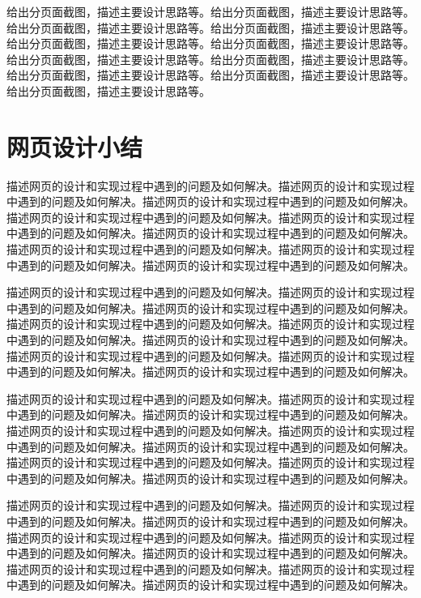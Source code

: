 \documentclass[supercite]{Experimental_Report}
\theoremstyle{definition}
\begin{document}
给出分页面截图，描述主要设计思路等。给出分页面截图，描述主要设计思路等。给出分页面截图，描述主要设计思路等。给出分页面截图，描述主要设计思路等。给出分页面截图，描述主要设计思路等。给出分页面截图，描述主要设计思路等。给出分页面截图，描述主要设计思路等。给出分页面截图，描述主要设计思路等。给出分页面截图，描述主要设计思路等。给出分页面截图，描述主要设计思路等。给出分页面截图，描述主要设计思路等。

\newpage

\section{网页设计小结}

描述网页的设计和实现过程中遇到的问题及如何解决。描述网页的设计和实现过程中遇到的问题及如何解决。描述网页的设计和实现过程中遇到的问题及如何解决。描述网页的设计和实现过程中遇到的问题及如何解决。描述网页的设计和实现过程中遇到的问题及如何解决。描述网页的设计和实现过程中遇到的问题及如何解决。描述网页的设计和实现过程中遇到的问题及如何解决。描述网页的设计和实现过程中遇到的问题及如何解决。描述网页的设计和实现过程中遇到的问题及如何解决。

描述网页的设计和实现过程中遇到的问题及如何解决。描述网页的设计和实现过程中遇到的问题及如何解决。描述网页的设计和实现过程中遇到的问题及如何解决。描述网页的设计和实现过程中遇到的问题及如何解决。描述网页的设计和实现过程中遇到的问题及如何解决。描述网页的设计和实现过程中遇到的问题及如何解决。描述网页的设计和实现过程中遇到的问题及如何解决。描述网页的设计和实现过程中遇到的问题及如何解决。描述网页的设计和实现过程中遇到的问题及如何解决。

描述网页的设计和实现过程中遇到的问题及如何解决。描述网页的设计和实现过程中遇到的问题及如何解决。描述网页的设计和实现过程中遇到的问题及如何解决。描述网页的设计和实现过程中遇到的问题及如何解决。描述网页的设计和实现过程中遇到的问题及如何解决。描述网页的设计和实现过程中遇到的问题及如何解决。描述网页的设计和实现过程中遇到的问题及如何解决。描述网页的设计和实现过程中遇到的问题及如何解决。描述网页的设计和实现过程中遇到的问题及如何解决。

描述网页的设计和实现过程中遇到的问题及如何解决。描述网页的设计和实现过程中遇到的问题及如何解决。描述网页的设计和实现过程中遇到的问题及如何解决。描述网页的设计和实现过程中遇到的问题及如何解决。描述网页的设计和实现过程中遇到的问题及如何解决。描述网页的设计和实现过程中遇到的问题及如何解决。描述网页的设计和实现过程中遇到的问题及如何解决。描述网页的设计和实现过程中遇到的问题及如何解决。描述网页的设计和实现过程中遇到的问题及如何解决。
\end{document}
